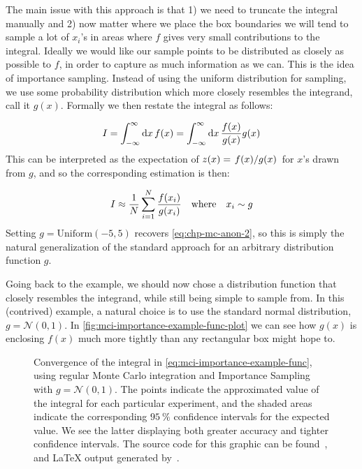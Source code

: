 \documentclass[Thesis.tex]{subfiles}
\begin{document}
The main issue with this approach is that 1) we need to truncate the integral
manually and 2) now matter where we place the box boundaries we will tend to
sample a lot of $x_i$'s in areas where $f$ gives very small contributions to
the integral. Ideally we would like our sample points to be distributed as
closely as possible to $f$, in order to capture as much information as we can.
This is the idea of importance sampling. Instead of using the uniform
distribution for sampling, we use some probability distribution which more
closely resembles the integrand, call it $g(x)$. Formally we then restate the integral as follows:

\begin{align}
    I = \int_{-\infty}^{\infty}\dd{x}f(x) = \int_{-\infty}^{\infty}\dd{x} \frac{f(x)}{g(x)} g(x)
\end{align}
This can be interpreted as the expectation of $z(x)=\flatfrac{f(x)}{g(x)}$ for $x$'s drawn from $g$, and so the corresponding estimation is then:

\begin{align}
    I \approx \frac{1}{N} \sum_{i=1}^N \frac{f(x_i)}{g(x_i)} \qq{where} x_i\sim g
\end{align}
Setting $g = \text{Uniform}(-5, 5)$ recovers \autoref{eq:chp-mc-anon-2}, so this is simply the natural generalization of the standard approach for an arbitrary distribution function $g$.


Going back to the example, we should now chose a distribution function that
closely resembles the integrand, while still being simple to sample from. In
this (contrived) example, a natural choice is to use the standard normal
distribution, $g = \mathcal{N}(0, 1)$. In
\autoref{fig:mci-importance-example-func-plot} we can see how $g(x)$ is
enclosing $f(x)$ much more tightly than any rectangular box might hope to.

\begin{figure}
   \centering
    \resizebox{\linewidth}{!}{%
        
    }
    \caption{\label{fig:mci-importance-example-func-convergence}Convergence of
    the integral in \autoref{eq:mci-importance-example-func}, using regular
    Monte Carlo integration and Importance Sampling with $g = \mathcal{N}(0,
    1)$. The points indicate the approximated value of the integral for each
    particular experiment, and the shaded areas indicate the corresponding
    $\SI{95}{\percent}$ confidence intervals for the expected value. We see the
    latter displaying both greater accuracy and tighter confidence intervals.
    The source code for this graphic can be found~\cite[TODO: Add
    path]{MS-thesis-repository}, and \LaTeX{} output generated
    by~\cite{nico_schlomer_2018_1173090}.}
\end{figure}
\end{document}
